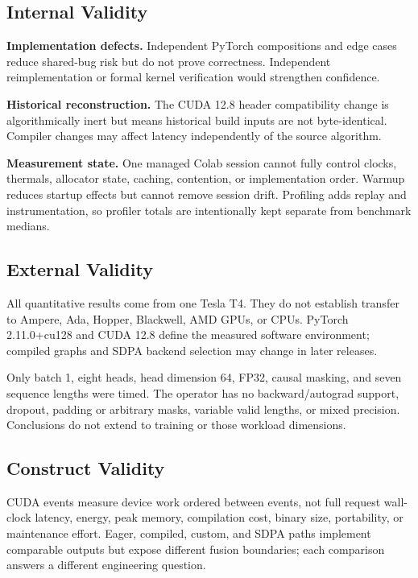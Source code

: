 \documentclass[twoside,twocolumn,10pt]{article}
\newcounter{algorithm}
\begin{document}
\subsection{Internal Validity}

\textbf{Implementation defects.} Independent PyTorch compositions and edge
cases reduce shared-bug risk but do not prove correctness. Independent
reimplementation or formal kernel verification would strengthen confidence.

\textbf{Historical reconstruction.} The CUDA 12.8 header compatibility change
is algorithmically inert but means historical build inputs are not
byte-identical. Compiler changes may affect latency independently of the source
algorithm.

\textbf{Measurement state.} One managed Colab session cannot fully control
clocks, thermals, allocator state, caching, contention, or implementation
order. Warmup reduces startup effects but cannot remove session drift.
Profiling adds replay and instrumentation, so profiler totals are intentionally
kept separate from benchmark medians.

\subsection{External Validity}

All quantitative results come from one Tesla T4. They do not establish
transfer to Ampere, Ada, Hopper, Blackwell, AMD GPUs, or CPUs. PyTorch
2.11.0+cu128 and CUDA 12.8 define the measured software environment; compiled
graphs and SDPA backend selection may change in later releases.

Only batch 1, eight heads, head dimension 64, FP32, causal masking, and seven
sequence lengths were timed. The operator has no backward/autograd support,
dropout, padding or arbitrary masks, variable valid lengths, or mixed
precision. Conclusions do not extend to training or those workload dimensions.

\subsection{Construct Validity}

CUDA events measure device work ordered between events, not full request
wall-clock latency, energy, peak memory, compilation cost, binary size,
portability, or maintenance effort. Eager, compiled, custom, and SDPA paths
implement comparable outputs but expose different fusion boundaries; each
comparison answers a different engineering question.
\end{document}
